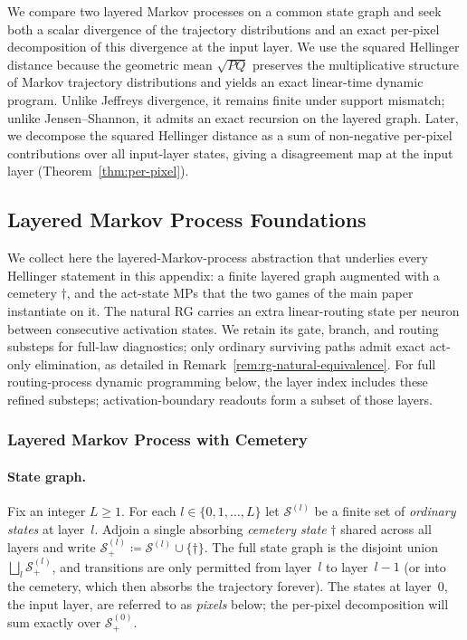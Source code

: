 \documentclass[twoside]{article}
\newcommand{\1}{\mathbf{1}}
\begin{document}
We compare two layered Markov processes on a common state graph and seek both a scalar divergence
of the trajectory distributions and an exact per-pixel decomposition of this divergence at the
input layer.  We use the squared Hellinger distance because the geometric mean $\sqrt{PQ}$
preserves the multiplicative structure of Markov trajectory distributions and yields an exact
linear-time dynamic program.  Unlike Jeffreys divergence, it remains finite under support mismatch;
unlike Jensen--Shannon, it admits an exact recursion on the layered graph.  Later, we decompose the
squared Hellinger distance as a sum of non-negative per-pixel contributions over all input-layer
states, giving a disagreement map at the input layer (Theorem~\ref{thm:per-pixel}).

\subsection{Layered Markov Process Foundations}\label{sec:lmp-foundations}

We collect here the layered-Markov-process abstraction that underlies every Hellinger statement in
this appendix: a finite layered graph augmented with a cemetery $\dagger$, and the act-state
\acp{MP} that the two games of the main paper instantiate on it. The natural \ac{RG} carries an
extra linear-routing state per neuron between consecutive activation states. We retain its
gate, branch, and routing substeps for full-law diagnostics; only ordinary surviving paths
admit exact act-only elimination, as detailed in Remark~\ref{rem:rg-natural-equivalence}.
For full routing-process dynamic programming below, the layer index includes these refined
substeps; activation-boundary readouts form a subset of those layers.

\subsubsection{Layered Markov Process with Cemetery}\label{sec:lmp}

\paragraph{State graph.}
Fix an integer $L \geq 1$.  For each $l \in \{0, 1, \ldots, L\}$ let $\mathcal{S}^{(l)}$ be a
finite set of \emph{ordinary states} at layer~$l$.  Adjoin a single absorbing \emph{cemetery state}
$\dagger$ shared across all layers and write $\mathcal{S}^{(l)}_+ \coloneqq \mathcal{S}^{(l)} \cup
    \{\dagger\}$.
The full state graph is the disjoint union $\bigsqcup_l \mathcal{S}^{(l)}_+$, and transitions are
only permitted from layer~$l$ to layer~$l{-}1$ (or into the cemetery, which then absorbs the
trajectory forever).  The states at layer~$0$, the input layer, are referred to as \emph{pixels}
below; the per-pixel decomposition will sum exactly over $\mathcal{S}^{(0)}_+$.
\end{document}
